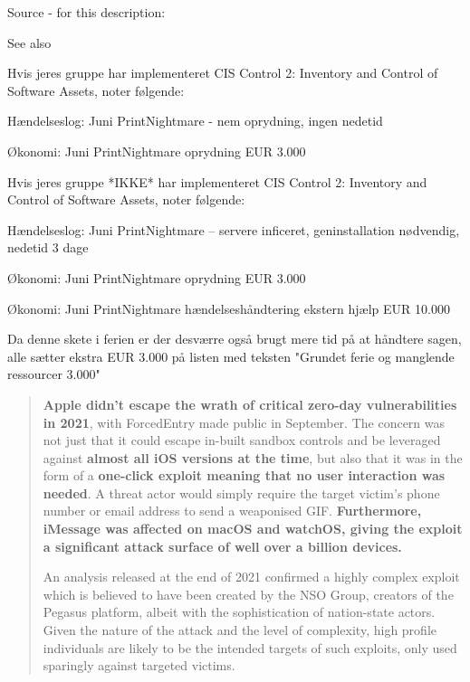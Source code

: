 \documentclass[Screen16to9,17pt]{foils}
\begin{document}
Source - for this description:\\

See also 



Hvis jeres gruppe har implementeret CIS Control 2: Inventory and Control of Software Assets, noter følgende:
\begin{list2}
\item Hændelseslog: Juni PrintNightmare - nem oprydning, ingen nedetid
\item Økonomi: Juni PrintNightmare oprydning EUR 3.000
\end{list2}


Hvis jeres gruppe *IKKE* har implementeret CIS Control 2: Inventory and Control of Software Assets, noter følgende:
\begin{list2}
\item Hændelseslog: Juni PrintNightmare -- servere inficeret, geninstallation nødvendig, nedetid 3 dage
\item Økonomi: Juni PrintNightmare oprydning EUR 3.000
\item Økonomi: Juni PrintNightmare hændelseshåndtering ekstern hjælp EUR 10.000
\end{list2}

Da denne skete i ferien er der desværre også brugt mere tid på at håndtere sagen, alle sætter ekstra EUR 3.000 på listen med teksten "Grundet ferie og manglende ressourcer 3.000"



\begin{quote}\small
{\bf Apple didn’t escape the wrath of critical zero-day vulnerabilities in 2021}, with ForcedEntry made public in September. The concern was not just that it could escape in-built sandbox controls and be leveraged against {\bf almost all iOS versions at the time}, but also that it was in the form of a {\bf one-click exploit meaning that no user interaction was needed}. A threat actor would simply require the target victim’s phone number or email address to send a weaponised GIF. {\bf Furthermore, iMessage was affected on macOS and watchOS, giving the exploit a significant attack surface of well over a billion devices.}

An analysis released at the end of 2021 confirmed a highly complex exploit which is believed to have been created by the NSO Group, creators of the Pegasus platform, albeit with the sophistication of nation-state actors. Given the nature of the attack and the level of complexity, high profile individuals are likely to be the intended targets of such exploits, only used sparingly against targeted victims.
\end{quote}
\end{document}
